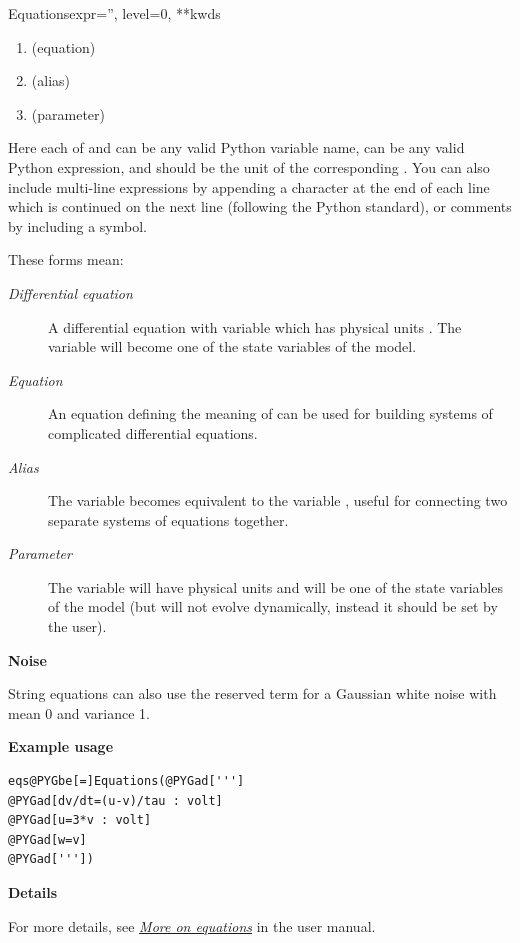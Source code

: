 \documentclass[letterpaper,10pt,english]{manual}
\begin{document}
\begin{classdesc}{Equations}{expr='', level=0, **kwds}
\begin{enumerate}
\item {} 
 (equation)

\item {} 
 (alias)

\item {} 
 (parameter)

\end{enumerate}

Here each of  and  can be any valid Python variable name,
 can be any valid Python expression, and  should be the
unit of the corresponding . You can also include multi-line
expressions by appending a \code{\textbackslash{}} character at the end of each line
which is continued on the next line (following the Python standard),
or comments by including a \code{\#} symbol.

These forms mean:
\begin{description}
\item[\emph{Differential equation}]
A differential equation with variable  which has physical
units . The variable  will become one of the state
variables of the model.

\item[\emph{Equation}]
An equation defining the meaning of  can be used for building
systems of complicated differential equations.

\item[\emph{Alias}]
The variable  becomes equivalent to the variable , useful
for connecting two separate systems of equations together.

\item[\emph{Parameter}]
The variable  will have physical units  and will be
one of the state variables of the model (but will not evolve
dynamically, instead it should be set by the user).

\end{description}
\textbf{Noise}

String equations can also use the reserved term  for a
Gaussian white noise with mean 0 and variance 1.

\textbf{Example usage}

\begin{Verbatim}[commandchars=@\[\]]
eqs@PYGbe[=]Equations(@PYGad[''']
@PYGad[dv/dt=(u-v)/tau : volt]
@PYGad[u=3*v : volt]
@PYGad[w=v]
@PYGad['''])
\end{Verbatim}

\textbf{Details}

For more details, see \hyperlink{moreonequations}{\emph{More on equations}} in the user manual.
\end{classdesc}
\end{document}
